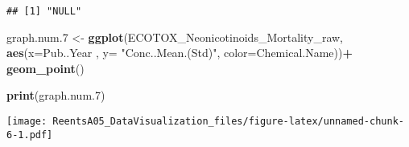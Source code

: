 \documentclass[]{article}
\newenvironment{Shaded}{\begin{snugshade}}{\end{snugshade}}
\newcommand{\KeywordTok}[1]{\textcolor[rgb]{0.13,0.29,0.53}{\textbf{#1}}}
\newcommand{\DataTypeTok}[1]{\textcolor[rgb]{0.13,0.29,0.53}{#1}}
\newcommand{\DecValTok}[1]{\textcolor[rgb]{0.00,0.00,0.81}{#1}}
\newcommand{\StringTok}[1]{\textcolor[rgb]{0.31,0.60,0.02}{#1}}
\newcommand{\OperatorTok}[1]{\textcolor[rgb]{0.81,0.36,0.00}{\textbf{#1}}}
\newcommand{\NormalTok}[1]{#1}
\begin{document}
\begin{verbatim}
## [1] "NULL"
\end{verbatim}

\begin{Shaded}
\begin{Highlighting}[]
\NormalTok{graph.num.}\DecValTok{7}\NormalTok{ <-}\StringTok{ }\KeywordTok{ggplot}\NormalTok{(ECOTOX_Neonicotinoids_Mortality_raw, }\KeywordTok{aes}\NormalTok{(}\DataTypeTok{x=}\NormalTok{Pub..Year , }\DataTypeTok{y=} \StringTok{"Conc..Mean.(Std)"}\NormalTok{, }\DataTypeTok{color=}\NormalTok{Chemical.Name))}\OperatorTok{+}
\StringTok{  }\KeywordTok{geom_point}\NormalTok{()}


\KeywordTok{print}\NormalTok{(graph.num.}\DecValTok{7}\NormalTok{)}
\end{Highlighting}
\end{Shaded}

\texttt{[image: ReentsA05\_DataVisualization\_files/figure-latex/unnamed-chunk-6-1.pdf]}
\end{document}
